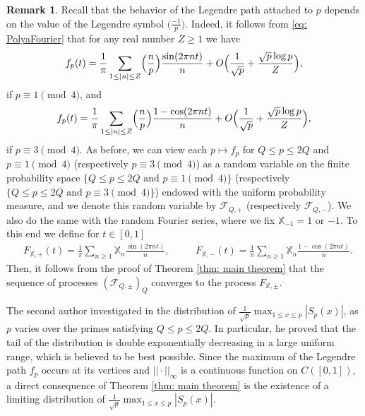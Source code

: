 \documentclass[JEP,XML,SOM,Unicode,NoFloatCountersInSection,published]{cedram}
\theoremstyle{plain}
\theoremstyle{definition}
\newtheorem{rem}[thm]{Remark}
\newcommand{\Legendre}[2]{\Bigl(\dfrac{#1}{#2}\Bigr)}
\newcommand{\legendre}[2]{\bigl(\tfrac{#1}{#2}\bigr)}
\newcommand{\X}{\mathbb{X}}
\begin{document}
\begin{rem} Recall that the behavior of the Legendre path attached to $p$ depends on the value of the Legendre symbol $\legendre{-1}{p}$. Indeed, it follows from \eqref{eq: PolyaFourier} that for any real number $Z\geq 1$ we have
\begin{equation} \label{eq: Polya1mod4}f_p(t) = \frac{1}{\pi } \sum_{1 \leq |n| \leq Z} \Legendre{n}{p} \frac{\sin(2\pi n t)}{n} + O\Bigl(\frac{1}{\sqrt{p}}+\frac{\sqrt{p}\log p}{Z}\Bigr),
\end{equation}
if $p\equiv 1 \pmod 4$, and
\begin{equation} \label{eq: Polya3mod4}f_p(t) = \frac{1}{\pi } \sum_{1 \leq |n| \leq Z} \Legendre{n}{p} \frac{1-\cos(2\pi n t)}{n} + O\Bigl(\frac{1}{\sqrt{p}}+\frac{\sqrt{p}\log p}{Z}\Bigr),
\end{equation}
if $p\equiv 3\pmod 4$. As before, we can view each $p \mapsto f_p$ for $Q\leq p\leq 2Q$ and $p\equiv 1\pmod 4$ (respectively $p\equiv 3\pmod 4$) as a random variable on the finite probability space $\{Q\leq p\leq 2Q \text{ and } p\equiv 1\pmod 4\}$ (respectively $\{Q\leq p\leq 2Q \text{ and } p\equiv 3\pmod 4\}$) endowed with the uniform probability measure, and we denote this random variable by $\mathcal{F}_{Q, +}$ (respectively $\mathcal{F}_{Q, -}$). We also
do the same with the random Fourier series, where we fix $\X_{-1} = 1$ or $-1$. To this end we define for $t\in [0, 1]$
\begin{align*}
&F_{\X,+}(t) = \frac{1}{\pi} \sum_{n \geq 1} \X_n \frac{\sin(2\pi nt)}{n}, &\quad &F_{\X,-}(t) = \frac{1}{\pi} \sum_{n \geq 1} \X_n \frac{1 - \cos(2 \pi n t)}{n}.
\end{align*}
Then, it follows from the proof of Theorem \ref{thm: main theorem} that the sequence of processes $(\mathcal{F}_{Q, \pm})_{Q}$ converges to the process $F_{\X, \pm}$.
\end{rem}

The second author investigated in \cite{La} the distribution of $\frac{1}{\sqrt{p}}\max_{1\leq x\leq p} |S_p(x)|$, as $p$ varies over the primes satisfying $Q\leq p\leq 2Q$. In particular, he proved that the tail of the distribution is double exponentially decreasing in a large uniform range, which is believed to be best possible. Since the maximum of the Legendre path $f_p$ occurs at its vertices and $||\cdot||_{\infty}$ is a continuous function on $C([0,1])$, a direct consequence of Theorem \ref{thm: main theorem} is the existence of a limiting distribution of $\frac{1}{\sqrt{p}}\max_{1\leq x\leq p} |S_p(x)|$.
\end{document}
